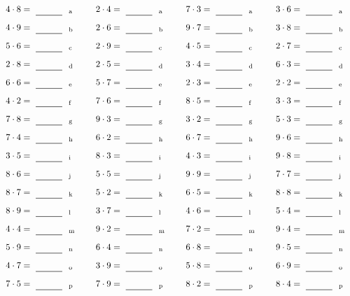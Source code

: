 \documentclass
[
  draft    = true,
  fontsize = 11pt,
  parskip  = half-
]
{scrartcl}
\begin{document}
\par\vfill\par
\begin{align*}
    \pline{4\cdot8}&=\rline{a}
  & \pline{2\cdot4}&=\rline{a}
  & \pline{7\cdot3}&=\rline{a}
  & \pline{3\cdot6}&=\rline{a} \\[1ex]
    \pline{4\cdot9}&=\rline{b}
  & \pline{2\cdot6}&=\rline{b}
  & \pline{9\cdot7}&=\rline{b}
  & \pline{3\cdot8}&=\rline{b} \\[1ex]
    \pline{5\cdot6}&=\rline{c}
  & \pline{2\cdot9}&=\rline{c}
  & \pline{4\cdot5}&=\rline{c}
  & \pline{2\cdot7}&=\rline{c} \\[1ex]
    \pline{2\cdot8}&=\rline{d}
  & \pline{2\cdot5}&=\rline{d}
  & \pline{3\cdot4}&=\rline{d}
  & \pline{6\cdot3}&=\rline{d} \\[1ex]
    \pline{6\cdot6}&=\rline{e}
  & \pline{5\cdot7}&=\rline{e}
  & \pline{2\cdot3}&=\rline{e}
  & \pline{2\cdot2}&=\rline{e} \\[1ex]
    \pline{4\cdot2}&=\rline{f}
  & \pline{7\cdot6}&=\rline{f}
  & \pline{8\cdot5}&=\rline{f}
  & \pline{3\cdot3}&=\rline{f} \\[1ex]
    \pline{7\cdot8}&=\rline{g}
  & \pline{9\cdot3}&=\rline{g}
  & \pline{3\cdot2}&=\rline{g}
  & \pline{5\cdot3}&=\rline{g} \\[1ex]
    \pline{7\cdot4}&=\rline{h}
  & \pline{6\cdot2}&=\rline{h}
  & \pline{6\cdot7}&=\rline{h}
  & \pline{9\cdot6}&=\rline{h} \\[1ex]
    \pline{3\cdot5}&=\rline{i}
  & \pline{8\cdot3}&=\rline{i}
  & \pline{4\cdot3}&=\rline{i}
  & \pline{9\cdot8}&=\rline{i} \\[1ex]
    \pline{8\cdot6}&=\rline{j}
  & \pline{5\cdot5}&=\rline{j}
  & \pline{9\cdot9}&=\rline{j}
  & \pline{7\cdot7}&=\rline{j} \\[1ex]
    \pline{8\cdot7}&=\rline{k}
  & \pline{5\cdot2}&=\rline{k}
  & \pline{6\cdot5}&=\rline{k}
  & \pline{8\cdot8}&=\rline{k} \\[1ex]
    \pline{8\cdot9}&=\rline{l}
  & \pline{3\cdot7}&=\rline{l}
  & \pline{4\cdot6}&=\rline{l}
  & \pline{5\cdot4}&=\rline{l} \\[1ex]
    \pline{4\cdot4}&=\rline{m}
  & \pline{9\cdot2}&=\rline{m}
  & \pline{7\cdot2}&=\rline{m}
  & \pline{9\cdot4}&=\rline{m} \\[1ex]
    \pline{5\cdot9}&=\rline{n}
  & \pline{6\cdot4}&=\rline{n}
  & \pline{6\cdot8}&=\rline{n}
  & \pline{9\cdot5}&=\rline{n} \\[1ex]
    \pline{4\cdot7}&=\rline{o}
  & \pline{3\cdot9}&=\rline{o}
  & \pline{5\cdot8}&=\rline{o}
  & \pline{6\cdot9}&=\rline{o} \\[1ex]
    \pline{7\cdot5}&=\rline{p}
  & \pline{7\cdot9}&=\rline{p}
  & \pline{8\cdot2}&=\rline{p}
  & \pline{8\cdot4}&=\rline{p}
\end{align*}
\end{document}
